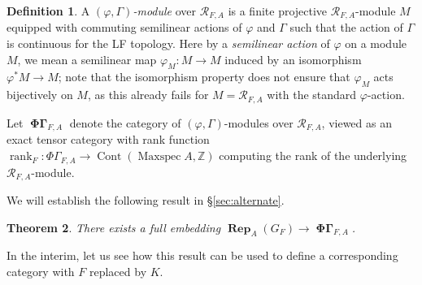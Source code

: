 \documentclass[12pt]{amsart}
\newtheorem{theorem}{Theorem}[section]
\theoremstyle{definition}
\newtheorem{defn}[theorem]{Definition}
\numberwithin{equation}{theorem}
\newcommand{\ZZ}{\mathbb{Z}}
\newcommand{\calR}{\mathcal{R}}
\DeclareMathOperator{\Maxspec}{Maxspec}
\DeclareMathOperator{\Cont}{Cont}
\DeclareMathOperator{\PhiGamma}{\mathbf{\Phi \Gamma}}
\DeclareMathOperator{\rank}{rank}
\DeclareMathOperator{\Rep}{\mathbf{Rep}}
\begin{document}
\begin{defn}
A \emph{$(\varphi, \Gamma)$-module} over $\calR_{F,A}$ is a finite projective $\calR_{F,A}$-module $M$ equipped with commuting semilinear actions of $\varphi$ and $\Gamma$ such that the action of $\Gamma$ is continuous for the LF topology. Here by a \emph{semilinear action} of $\varphi$ on a module $M$, we mean a semilinear map $\varphi_M: M \to M$ induced by an isomorphism $\varphi^* M \to M$; note that the isomorphism property does not ensure that $\varphi_M$ acts bijectively on $M$, as this already fails for $M = \calR_{F,A}$ with the standard $\varphi$-action.

Let $\PhiGamma_{F,A}$ denote the category of $(\varphi, \Gamma)$-modules over $\calR_{F,A}$, viewed as an exact tensor category with rank function $\rank_F: \Phi\Gamma_{F,A} \to \Cont(\Maxspec A,\ZZ)$ computing the rank of the underlying $\calR_{F,A}$-module.
\end{defn}

We will establish the following result in \S\ref{sec:alternate}.
\begin{theorem} \label{T:phi gamma embedding1}
There exists a full embedding $\Rep_A(G_F) \to \PhiGamma_{F,A}$.
\end{theorem}
In the interim, let us see how this result can be used to define a corresponding category with $F$ replaced by $K$.
\end{document}
